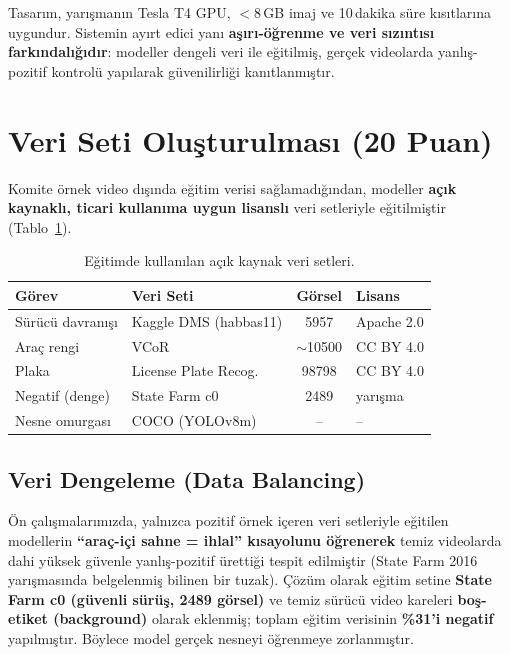 \documentclass[onecolumn,11pt]{IEEEtran}
\begin{document}
Tasarım, yarışmanın Tesla T4 GPU, $<$8\,GB imaj ve 10\,dakika süre kısıtlarına
uygundur. Sistemin ayırt edici yanı \textbf{aşırı-öğrenme ve veri sızıntısı
farkındalığıdır}: modeller dengeli veri ile eğitilmiş, gerçek videolarda
yanlış-pozitif kontrolü yapılarak güvenilirliği kanıtlanmıştır.

\section{Veri Seti Oluşturulması (20 Puan)}
Komite örnek video dışında eğitim verisi sağlamadığından, modeller
\textbf{açık kaynaklı, ticari kullanıma uygun lisanslı} veri setleriyle
eğitilmiştir (Tablo~\ref{tab:veri}).

\begin{table}[h]
\centering
\caption{Eğitimde kullanılan açık kaynak veri setleri.}
\label{tab:veri}
\small
\begin{tabularx}{\columnwidth}{l l c l}
\toprule
\textbf{Görev} & \textbf{Veri Seti} & \textbf{Görsel} & \textbf{Lisans} \\
\midrule
Sürücü davranışı & Kaggle DMS (habbas11) & 5957 & Apache 2.0 \\
Araç rengi & VCoR & $\sim$10500 & CC BY 4.0 \\
Plaka & License Plate Recog. & 98798 & CC BY 4.0 \\
Negatif (denge) & State Farm c0 & 2489 & yarışma \\
Nesne omurgası & COCO (YOLOv8m) & -- & -- \\
\bottomrule
\end{tabularx}
\end{table}

\subsection{Veri Dengeleme (Data Balancing)}
Ön çalışmalarımızda, yalnızca pozitif örnek içeren veri setleriyle eğitilen
modellerin \textbf{``araç-içi sahne = ihlal'' kısayolunu öğrenerek} temiz
videolarda dahi yüksek güvenle yanlış-pozitif ürettiği tespit edilmiştir (State
Farm 2016 yarışmasında belgelenmiş bilinen bir tuzak). Çözüm olarak eğitim setine
\textbf{State Farm c0 (güvenli sürüş, 2489 görsel)} ve temiz sürücü video kareleri
\textbf{boş-etiket (background)} olarak eklenmiş; toplam eğitim verisinin
\textbf{\%31'i negatif} yapılmıştır. Böylece model gerçek nesneyi öğrenmeye
zorlanmıştır.
\end{document}
